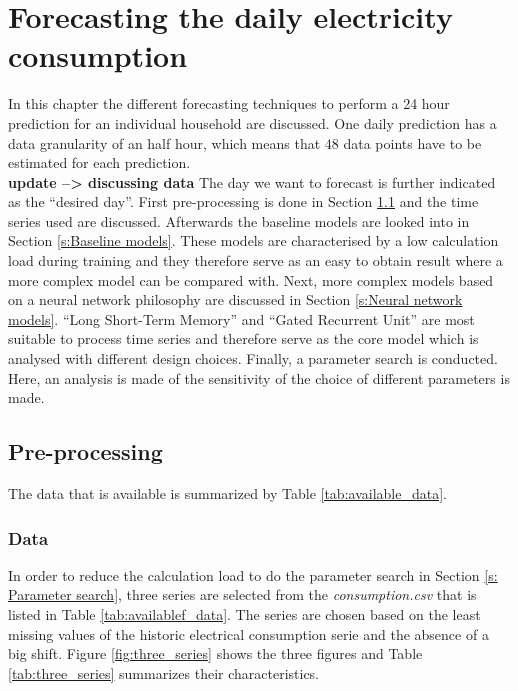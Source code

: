 \chapter{Forecasting the daily electricity consumption}
\label{cha:Forecasting the daily electricity consumption}
In this chapter the different forecasting techniques to perform a 24 hour prediction for an individual household are discussed. One daily prediction has a data granularity of an half hour, which means that $ 48 $ data points have to be estimated for each prediction. \\\textbf{update --> discussing data} The day we want to forecast is further indicated as the ``desired day''. 
First pre-processing is done in Section \ref{s:Pre-processing} and the time series used are discussed. Afterwards the baseline models are looked into in Section \ref{s:Baseline models}. These models are characterised by a low calculation load during training and they therefore serve as an easy to obtain result where a more complex model can be compared with. Next, more complex models based on a neural network philosophy are discussed in Section \ref{s:Neural network models}. ``Long Short-Term Memory'' and ``Gated Recurrent Unit'' are most suitable to process time series and therefore serve as the core model which is analysed with different design choices. Finally, a parameter search is conducted. Here, an analysis is made of the sensitivity of the choice of different parameters is made.\\
 
\section{Pre-processing}\label{s:Pre-processing}
The data that is available is summarized by Table \ref{tab:available_data}. 

\subsection{Data}
In order to reduce the calculation load to do the parameter search in Section \ref{s: Parameter search}, three series are selected from the \textit{consumption.csv} that is listed in Table \ref{tab:availablef_data}. The series are chosen based on the least missing values of the historic electrical consumption serie and the absence of a big shift. Figure \ref{fig:three_series} shows the three figures and Table \ref{tab:three_series} summarizes their characteristics.\\

